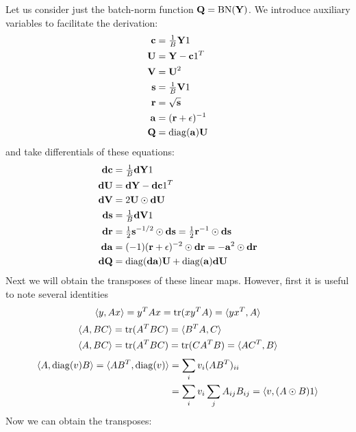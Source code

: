 Let us consider just the batch-norm function $\obj{Q} = \bnorm(\obj{Y})$.
We introduce auxiliary variables to facilitate the derivation:
\begin{align}
\obj{c} & = \tfrac{1}{B} \obj{Y} 1 \\
\obj{U} & = \obj{Y} - \obj{c} 1^{T} \\
\obj{V} & = \obj{U}^{2} \\
\obj{s} & = \tfrac{1}{B} \obj{V} 1 \\
\obj{r} & = \sqrt{\obj{s}} \\
\obj{a} & = (\obj{r} + \epsilon)^{-1} \\
\obj{Q} & = \diag(\obj{a}) \obj{U}
\end{align}
and take differentials of these equations:
\begin{align}
\obj{dc} & = \tfrac{1}{B} \obj{dY} 1 \\
\obj{dU} & = \obj{dY} - \obj{dc} 1^{T} \\
\obj{dV} & = 2 \obj{U} \odot \obj{dU} \\
\obj{ds} & = \tfrac{1}{B} \obj{dV} 1 \\
\obj{dr} & = \tfrac{1}{2} \obj{s}^{-1/2} \odot \obj{ds} = \tfrac{1}{2} \obj{r}^{-1} \odot \obj{ds} \\
\obj{da} & = (-1) (\obj{r} + \epsilon)^{-2} \odot \obj{dr} = -\obj{a}^{2} \odot \obj{dr} \\
\obj{dQ} & = \diag(\obj{da}) \obj{U} + \diag(\obj{a}) \obj{dU}
\end{align}
Next we will obtain the transposes of these linear maps.
However, first it is useful to note several identities
\begin{equation}
\langle y, A x \rangle = y^{T} A x = \trace(x y^{T} A) = \langle y x^{T} , A \rangle
\end{equation}
\begin{align}
\langle A, B C \rangle & = \trace(A^T B C) = \langle B^{T} A, C \rangle \\
\langle A, B C \rangle & = \trace(A^T B C) = \trace(C A^T B) = \langle A C^{T}, B \rangle
\end{align}
\begin{align}
\langle A, \diag(v) B \rangle
= \langle A B^{T}, \diag(v) \rangle
& = \sum_{i} v_{i} (A B^{T})_{i i} \\
& = \sum_{i} v_{i} \sum_{j} A_{i j} B_{i j}
= \langle v, (A \odot B)1 \rangle
\end{align}
Now we can obtain the transposes:
